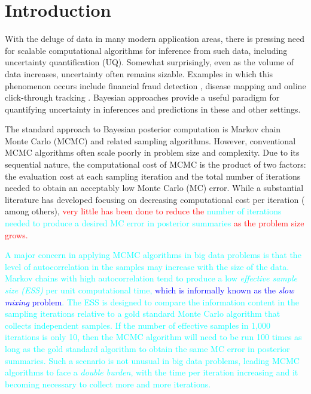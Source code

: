 \documentclass[11pt]{article}
\newcommand{\leojames}[1]{\textcolor{blue}{#1}}
\newcommand{\leo}[1]{{\textcolor{red}{#1}}}
\newcommand{\dave}[1]{{\textcolor{cyan}{#1}}}
\begin{document}
\vfill

\newpage



\section{Introduction}

With the deluge of data in many modern application areas, there is pressing need for scalable computational algorithms for inference from such data, including uncertainty quantification (UQ).  Somewhat surprisingly, even as the volume of data increases, uncertainty often remains sizable.  Examples in which this phenomenon occurs include financial fraud detection \citep{ngai2011application}, disease mapping \citep{wakefield2007disease} and online click-through tracking \citep{wang2010click}.  Bayesian approaches provide a useful paradigm for quantifying uncertainty in inferences and predictions in these and other settings.

The standard approach to Bayesian posterior computation is Markov chain Monte Carlo (MCMC) and related sampling algorithms. However,  conventional MCMC algorithms often scale poorly in problem size and complexity. Due to its sequential nature, the computational cost of MCMC is the product of two factors: the evaluation cost at each sampling iteration and the total number of iterations needed to obtain an acceptably low Monte Carlo (MC) error. While a substantial literature has developed focusing on decreasing computational cost per iteration (\cite{minsker2014robust,maclaurin2014firefly,
srivastava2015wasp,conrad2015accelerating} among others), \leo{very little has been done
to reduce the} \dave{number of iterations needed to produce a desired MC error in posterior summaries} 
\leo{as the problem size grows.}

\dave{A major concern in applying MCMC algorithms in big data problems is that the level of autocorrelation in the samples may increase with the size of the data.  Markov chains with high autocorrelation 
tend to produce a low {\em effective sample size (ESS)} per unit computational time, \leojames{which is informally known as the  {\em slow mixing} problem}.  The ESS is designed to compare the information content in the sampling iterations relative to a gold standard Monte Carlo algorithm that collects independent samples.  If the number of effective samples in 1,000 iterations is only 10, then the MCMC algorithm will need to be run 100 times as long as the gold standard algorithm to obtain the same MC error in posterior summaries.  Such a scenario is not unusual in big data problems, leading MCMC algorithms to face a {\em double burden}, with the time per iteration increasing and it becoming necessary to collect more and more iterations.} 
\end{document}
